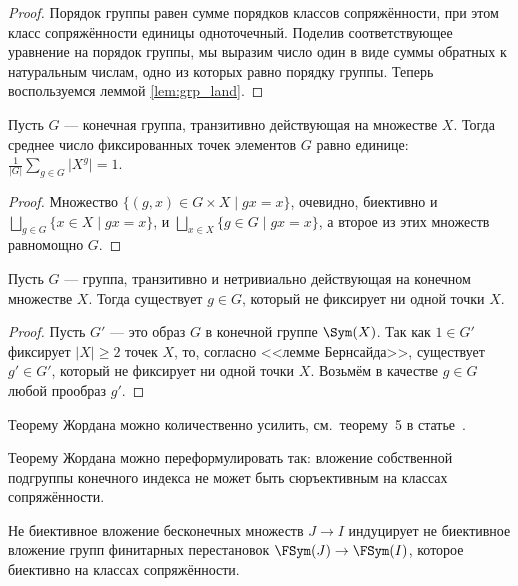 \documentclass[
	extrafontsizes,
	11pt,
	hyphens,
]{memoir}
\begin{document}
\begin{proof}
Порядок группы равен сумме порядков классов сопряжённости, при этом класс сопряжённости единицы одноточечный.
Поделив соответствующее уравнение на порядок группы, мы выразим число один в виде суммы обратных к натуральным числам, одно из которых равно порядку группы.
Теперь воспользуемся леммой \ref{lem:grp_land}.
\end{proof}

\begin{theorem}
Пусть \(G\) --- конечная группа, транзитивно действующая на множестве \(X\).
Тогда среднее число фиксированных точек элементов \(G\) равно единице:
\(
\frac{1}{\lvert G \rvert} \sum_{g \in G} \lvert X^g \rvert = 1
\).
\end{theorem}

\begin{proof}
Множество \(\{(g,x) \in G \times X \mid gx = x\}\), очевидно, биективно и \(\bigsqcup_{g \in G} \{x \in X \mid gx = x\}\), и \(\bigsqcup_{x \in X} \{g \in G \mid gx = x\}\), а второе из этих множеств равномощно \(G\).
\end{proof}

\begin{corollary}
Пусть \(G\) --- группа, транзитивно и нетривиально действующая на конечном множестве \(X\).
Тогда существует \(g \in G\), который не фиксирует ни одной точки \(X\).
\end{corollary}

\begin{proof}
Пусть \(G'\) --- это образ \(G\) в конечной группе \(\Sym(X)\). Так как \(1 \in G'\) фиксирует \(\lvert X \rvert \geq 2\) точек \(X\), то, согласно <<лемме Бернсайда>>, существует \(g' \in G'\), который не фиксирует ни одной точки \(X\). Возьмём в качестве \(g \in G\) любой прообраз \(g'\).
\end{proof}

\begin{remark}
Теорему Жордана можно количественно усилить, см.\ теорему~5 в статье~\cite{Serre_2003}.
\end{remark}

\begin{remark}
Теорему Жордана можно переформулировать так:
вложение собственной подгруппы конечного индекса не может быть сюръективным на классах сопряжённости.
\end{remark}

\begin{remark}
Не биективное вложение бесконечных множеств \(J \to I\) индуцирует не биективное вложение групп финитарных перестановок \(\FSym(J) \to \FSym(I)\), которое биективно на классах сопряжённости.
\end{remark}
\end{document}
